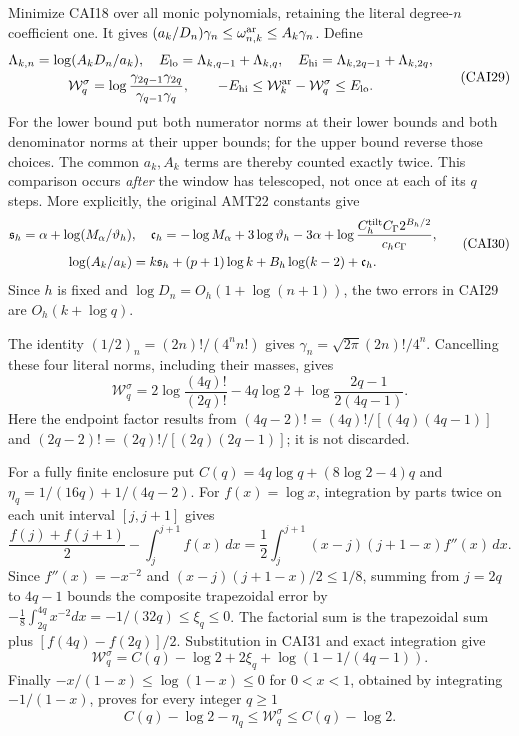 Minimize CAI18 over all monic polynomials, retaining the literal
degree-$n$ coefficient one. It gives
$(a_k/D_n)\gamma_n\le\omega_{n,k}^{\rm ar}\le A_k\gamma_n$.
Define
\[
\begin{gathered}
 \Lambda_{k,n}=\log(A_kD_n/a_k),\quad
 E_{\rm lo}=\Lambda_{k,q-1}+\Lambda_{k,q},\quad
 E_{\rm hi}=\Lambda_{k,2q-1}+\Lambda_{k,2q},\\
 \mathcal W_q^\sigma=\log\frac{\gamma_{2q-1}\gamma_{2q}}
                                     {\gamma_{q-1}\gamma_q},\qquad
 -E_{\rm hi}\le\mathcal W_k^{\rm ar}-\mathcal W_q^\sigma\le E_{\rm lo}.
\end{gathered}\tag{CAI29}
\]
For the lower bound put both numerator norms at their lower bounds
and both denominator norms at their upper bounds; for the upper bound
reverse those choices. The common $a_k,A_k$ terms are thereby counted
exactly twice. This comparison occurs \emph{after} the window has
telescoped, not once at each of its $q$ steps. More explicitly, the
original AMT22 constants give
\[
\begin{gathered}
 \mathfrak s_h=\alpha+\log(M_\alpha/\vartheta_h),\quad
 \mathfrak c_h=-\log M_\alpha+3\log\vartheta_h-3\alpha+
       \log\frac{C_h^{\rm tilt}C_\Gamma2^{B_h/2}}{c_hc_\Gamma},\\
 \log(A_k/a_k)=k\mathfrak s_h+(p+1)\log k+B_h\log(k-2)+\mathfrak c_h.
\end{gathered}\tag{CAI30}
\]
Since $h$ is fixed and $\log D_n=O_h(1+\log(n+1))$, the two errors
in CAI29 are $O_h(k+\log q)$.

The identity $(1/2)_n=(2n)!/(4^nn!)$ gives
$\gamma_n=\sqrt{2\pi}(2n)!/4^n$. Cancelling these four literal norms,
including their masses, gives
\[
 \mathcal W_q^\sigma
 =2\log\frac{(4q)!}{(2q)!}-4q\log2
                       +\log\frac{2q-1}{2(4q-1)}.\tag{CAI31}
\]
Here the endpoint factor results from
$(4q-2)!=(4q)!/[(4q)(4q-1)]$ and
$(2q-2)!=(2q)!/[(2q)(2q-1)]$; it is not discarded.

For a fully finite enclosure put
$C(q)=4q\log q+(8\log2-4)q$ and
$\eta_q=1/(16q)+1/(4q-2)$. For $f(x)=\log x$, integration by parts
twice on each unit interval $[j,j+1]$ gives
\[
 \frac{f(j)+f(j+1)}2-\int_j^{j+1}f(x)\,dx
 =\frac12\int_j^{j+1}(x-j)(j+1-x)f''(x)\,dx.
\]
Since $f''(x)=-x^{-2}$ and $(x-j)(j+1-x)/2\le1/8$, summing from
$j=2q$ to $4q-1$ bounds the composite trapezoidal error by
$-\frac18\int_{2q}^{4q}x^{-2}dx=-1/(32q)\le\xi_q\le0$.
The factorial sum is the trapezoidal sum plus
$[f(4q)-f(2q)]/2$. Substitution in CAI31 and exact integration give
\[
 \mathcal W_q^\sigma=C(q)-\log2+2\xi_q+
                                  \log(1-1/(4q-1)).
\]
Finally $-x/(1-x)\le\log(1-x)\le0$ for $0<x<1$, obtained by
integrating $-1/(1-x)$, proves for every integer $q\ge1$
\[
 C(q)-\log2-\eta_q\le\mathcal W_q^\sigma\le C(q)-\log2.
 \tag{CAI32}
\]

